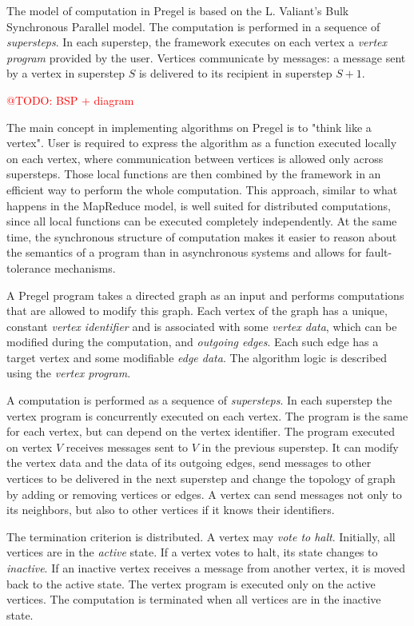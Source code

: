 \documentclass{pracamgr}
\makeatletter
\theoremstyle{plain}
\theoremstyle{definition}
\theoremstyle{remark}
\newcommand{\todo}[1]{\textcolor{red}{@TODO: #1}}
\makeatother
\begin{document}
The model of computation in Pregel is based on the L. Valiant's Bulk Synchronous Parallel model. The computation is performed in a sequence of \emph{supersteps}. In each superstep, the framework executes on each vertex a \emph{vertex program} provided by the user. Vertices communicate by messages: a message sent by a vertex in superstep $S$ is delivered to its recipient in superstep $S+1$.

\todo{BSP + diagram}

The main concept in implementing algorithms on Pregel is to "think like a vertex". User is required to express the algorithm as a function executed locally on each vertex, where communication between vertices is allowed only across supersteps. Those local functions are then combined by the framework in an efficient way to perform the whole computation. This approach, similar to what happens in the MapReduce model, is well suited for distributed computations, since all local functions can be executed completely independently. At the same time, the synchronous structure of computation makes it easier to reason about the semantics of a program than in asynchronous systems and allows for fault-tolerance mechanisms.

A Pregel program takes a directed graph as an input and performs computations that are allowed to modify this graph.
Each vertex of the graph has a unique, constant \emph{vertex identifier} and is associated with some \emph{vertex data}, which can be modified during the computation, and \emph{outgoing edges}. Each such edge has a target vertex and some modifiable \emph{edge data}. The algorithm logic is described using the \emph{vertex program}.

A computation is performed as a sequence of \emph{supersteps}. In each superstep the vertex program is concurrently executed on each vertex. The program is the same for each vertex, but can depend on the vertex identifier. The program executed on vertex $V$ receives messages sent to $V$ in the previous superstep. It can modify the vertex data and the data of its outgoing edges, send messages to other vertices to be delivered in the next superstep and change the topology of graph by adding or removing vertices or edges. A vertex can send messages not only to its neighbors, but also to other vertices if it knows their identifiers.

The termination criterion is distributed. A vertex may \emph{vote to halt}. Initially, all vertices are in the \emph{active} state. If a vertex votes to halt, its state changes to \emph{inactive}. If an inactive vertex receives a message from another vertex, it is moved back to the active state. The vertex program is executed only on the active vertices. The computation is terminated when all vertices are in the inactive state.
\end{document}
